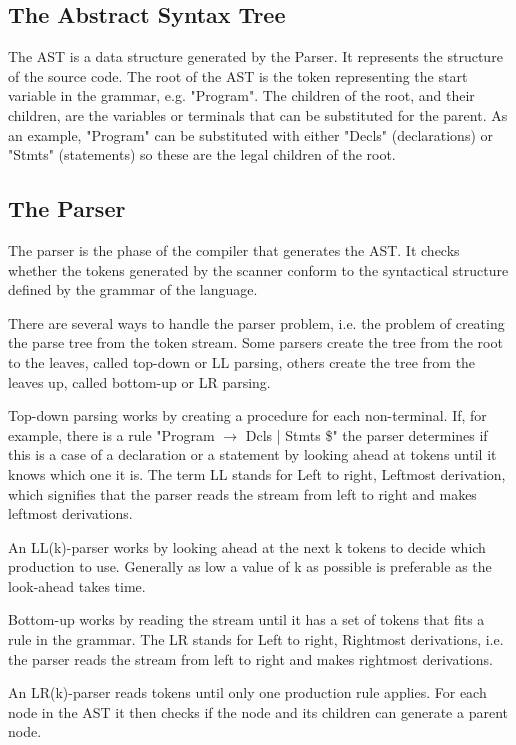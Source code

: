 \subsection{The Abstract Syntax Tree}
The AST is a data structure generated by the Parser. It represents the structure of the source code. The root of the AST is the token representing the start variable in the grammar, e.g. "Program". The children of the root, and their children, are the variables or terminals that can be substituted for the parent. As an example, "Program" can be substituted with either "Decls" (declarations) or "Stmts" (statements) so these are the legal children of the root. 

\subsection{The Parser}

The parser is the phase of the compiler that generates the AST. It checks whether the tokens generated by the scanner conform to the syntactical structure defined by the grammar of the language. 

There are several ways to handle the parser problem, i.e. the problem of creating the parse tree from the token stream. Some parsers create the tree from the root to the leaves, called top-down or LL parsing, others create the tree from the leaves up, called bottom-up or LR parsing. 

Top-down parsing works by creating a procedure for each non-terminal. If, for example, there is a rule "Program $\rightarrow$ Dcls | Stmts \$" the parser determines if this is a case of a declaration or a statement by looking ahead at tokens until it knows which one it is. The term LL stands for Left to right, Leftmost derivation, which signifies that the parser reads the stream from left to right and makes leftmost derivations.

An LL(k)-parser works by looking ahead at the next k tokens to decide which production to use. Generally as low a value of k as possible is preferable as the look-ahead takes time. 

Bottom-up works by reading the stream until it has a set of tokens that fits a rule in the grammar. The LR stands for Left to right, Rightmost derivations, i.e. the parser reads the stream from left to right and makes rightmost derivations.

An LR(k)-parser reads tokens until only one production rule applies. For each node in the AST it then checks if the node and its children can generate a parent node.

